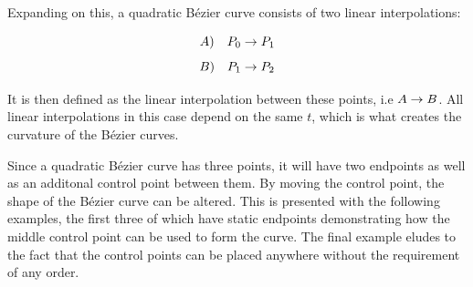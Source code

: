     Expanding on this, a quadratic Bézier curve consists of two linear interpolations:
    
    $$ A) \quad P_0 \rightarrow P_1 $$
    $$ B) \quad P_1 \rightarrow P_2 $$
    
    It is then defined as the linear interpolation between these points, i.e $ A \rightarrow B $. All linear interpolations in this case depend on the same $t$, which is what creates the curvature of the Bézier curves.

    Since a quadratic Bézier curve has three points, it will have two endpoints as well as an additonal control point between them. By moving the control point, the shape of the Bézier curve can be altered. This is presented with the following examples, the first three of which have static endpoints demonstrating how the middle control point can be used to form the curve. The final example eludes to the fact that the control points can be placed anywhere without the requirement of any order.

